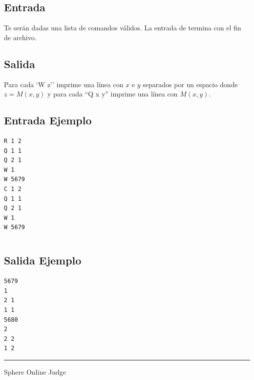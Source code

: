 \documentclass[letter,10pt]{article}
\newcommand{\lyxaddress}[1]{
\par {\raggedright #1
\vspace{1.4em}
\noindent\par}
}
\begin{document}
\subsection*{Entrada}

Te serán dadas una lista de comandos válidos. La entrada de termina con el fin de archivo.

\subsection*{Salida}

Para cada `W z'' imprime una línea con $x$ e $y$ separados por un espacio donde $z=M(x,y)$ y para cada ``Q x y'' imprime una línea con $M(x,y)$.

\subsection*{Entrada Ejemplo}

\begin{verbatim}
R 1 2
Q 1 1
Q 2 1
W 1
W 5679
C 1 2
Q 1 1
Q 2 1
W 1
W 5679
\end{verbatim}

$$$$
$$$$
$$$$
$$$$
$$$$
$$$$
$$$$
$$$$
$$$$
$$$$
$$$$

\subsection*{Salida Ejemplo}

\begin{verbatim}
5679
1
2 1
1 1
5680
2
2 2
1 2
\end{verbatim}

\noindent \rule[0.5ex]{1\columnwidth}{1pt}


\lyxaddress{Sphere Online Judge}
\end{document}
